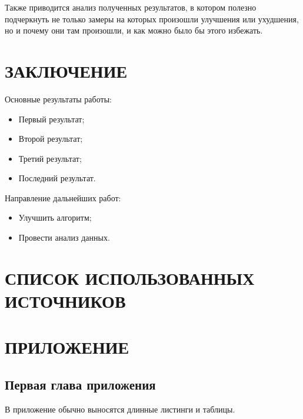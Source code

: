 Также приводится анализ полученных результатов, в котором полезно
подчеркнуть не только замеры на которых произошли улучшения или
ухудшения, но и почему они там произошли, и как можно было бы этого
избежать.

\clearpage
\pagebreak

\section*{ЗАКЛЮЧЕНИЕ}\label{sec:conclusion}

Основные результаты работы:

\begin{itemize}
\tightlist
\item
  Первый результат;
\item
  Второй результат;
\item
  Третий результат;
\item
  Последний результат.
\end{itemize}

Направление дальнейших работ:

\begin{itemize}
\tightlist
\item
  Улучшить алгоритм;
\item
  Провести анализ данных.
\end{itemize}

\clearpage
\pagebreak

\section*{СПИСОК ИСПОЛЬЗОВАННЫХ ИСТОЧНИКОВ}\label{sec:bib}

\printbibliography[heading=none]

\renewcommand{\thesection}{П}
\setcounter{subsection}{0}
\setcounter{figure}{0}
\setcounter{lstlisting}{0}
\pagebreak

\section*{ПРИЛОЖЕНИЕ}\label{sec:appendix}

\subsection{Первая глава приложения}\label{sec:appendix-1}

В приложение обычно выносятся длинные листинги и таблицы.


